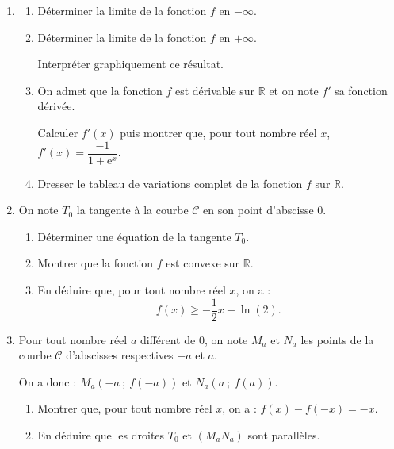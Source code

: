 \documentclass[10pt]{article}
\providecommand{\R}{\mathbb{R}}
\begin{document}
\begin{enumerate}
\item 
	\begin{enumerate}
		\item Déterminer la limite de la fonction $f$ en $-\infty$.
		\item Déterminer la limite de la fonction $f$ en $+ \infty$.
		
Interpréter graphiquement ce résultat.
		\item On admet que la fonction $f$ est dérivable sur $\R$ et on note $f'$ sa fonction dérivée.
		
Calculer $f'(x)$ puis montrer que, pour tout nombre réel $x$,\: $f'(x) = \dfrac{-1}{1 + \text{e}^x}$.
		\item Dresser le tableau de variations complet de la fonction $f$ sur $\R$.
	\end{enumerate}	
\item On note $T_0$ la tangente à la courbe $\mathcal{C}$ en son point d'abscisse $0$.
	\begin{enumerate}
		\item Déterminer une équation de la tangente $T_0$.
		\item Montrer que la fonction $f$ est convexe sur $\R$.
		\item En déduire que, pour tout nombre réel $x$, on a : 
		\[f(x) \geqslant  - \dfrac12x + \ln (2).\]
		\end{enumerate}	
\item Pour tout nombre réel $a$ différent de 0, on note $M_a$ et $N_a$ les points de la courbe $\mathcal{C}$ d'abscisses respectives $-a$ et $a$. 

On a donc : $M_a\left(-a~;~ f(-a)\right)$ et $N_a\left(a~;~ f(a)\right)$.
	\begin{enumerate}
		\item Montrer que, pour tout nombre réel $x$, on a : $f(x) - f(-x) = - x$.
		\item En déduire que les droites $T_0$ et $\left(M_aN_a\right)$ sont parallèles.
	\end{enumerate}
\end{enumerate}
\end{document}
